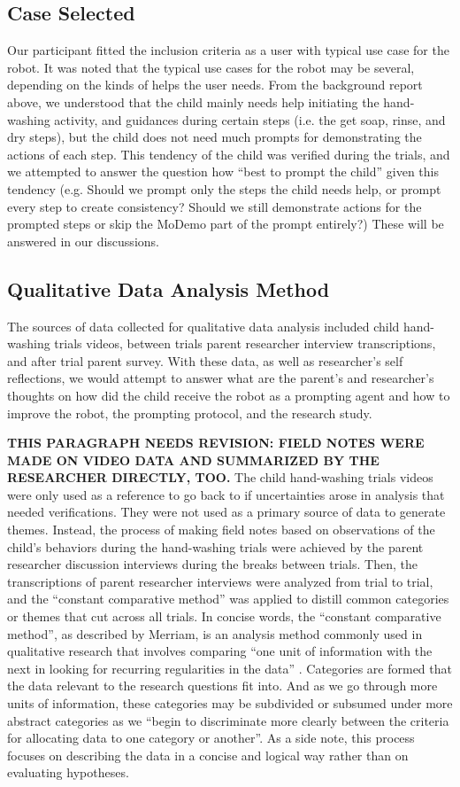 \subsection{Case Selected}
Our participant fitted the inclusion criteria as a user with typical use case for the robot.  It was noted that the typical use cases for the robot may be several, depending on the kinds of helps the user needs.  From the background report above, we understood that the child mainly needs help initiating the hand-washing activity, and guidances during certain steps (i.e. the get soap, rinse, and dry steps), but the child does not need much prompts for demonstrating the actions of each step.  This tendency of the child was verified during the trials, and we attempted to answer the question how ``best to prompt the child'' given this tendency (e.g. Should we prompt only the steps the child needs help, or prompt every step to create consistency?  Should we still demonstrate actions for the prompted steps or skip the MoDemo part of the prompt entirely?)  These will be answered in our discussions.

\subsection{Qualitative Data Analysis Method}
The sources of data collected for qualitative data analysis included child hand-washing trials videos, between trials parent researcher interview transcriptions, and after trial parent survey.  With these data, as well as researcher's self reflections, we would attempt to answer what are the parent's and researcher's thoughts on how did the child receive the robot as a prompting agent and how to improve the robot, the prompting protocol, and the research study.

\textbf{THIS PARAGRAPH NEEDS REVISION: FIELD NOTES WERE MADE ON VIDEO DATA AND SUMMARIZED BY THE RESEARCHER DIRECTLY, TOO.}
The child hand-washing trials videos were only used as a reference to go back to if uncertainties arose in analysis that needed verifications.  They were not used as a primary source of data to generate themes.  Instead, the process of making field notes based on observations of the child's behaviors during the hand-washing trials were achieved by the parent researcher discussion interviews during the breaks between trials.  Then, the transcriptions of parent researcher interviews were analyzed from trial to trial, and the ``constant comparative method'' was applied to distill common categories or themes that cut across all trials.  In concise words, the ``constant comparative method'', as described by Merriam, is an analysis method commonly used in qualitative research that involves comparing ``one unit of information with the next in looking for recurring regularities in the data'' \cite{merriam2014qualitative}.  Categories are formed that the data relevant to the research questions fit into.  And as we go through more units of information, these categories may be subdivided or subsumed under more abstract categories as we ``begin to discriminate more clearly between the criteria for allocating data to one category or another''.  As a side note, this process focuses on describing the data in a concise and logical way rather than on evaluating hypotheses.


